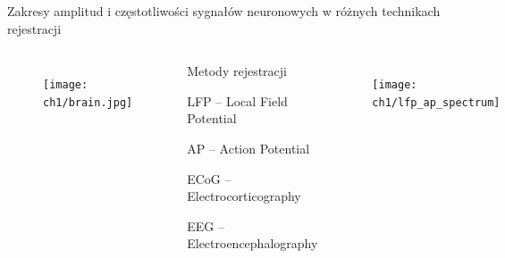 \begin{frame}{Zakresy amplitud i częstotliwości sygnałów neuronowych w różnych technikach rejestracji}
    \begin{columns}
        \vspace{-2em}

        \begin{figure}[H]
            \texttt{[image: ch1/brain.jpg]}
          \end{figure}
          \begin{block}{Metody rejestracji}
            \begin{itemize}
                {\renewcommand\normalsize{\small}%
                \normalsize
                \item LFP -- Local Field Potential
                \item AP --  Action Potential
                \item ECoG -- Electrocorticography
                \item EEG -- Electroencephalography
                }
            \end{itemize}
        \end{block}
        \vspace{-2em}

        \begin{figure}[H]
            \centering
            \texttt{[image: ch1/lfp\_ap\_spectrum]}  
            \end{figure}	
    \end{columns}
    
\end{frame}


